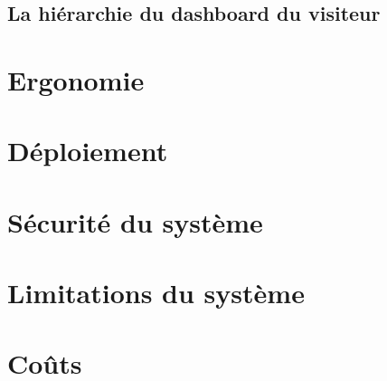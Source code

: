         \subsection{La hiérarchie du dashboard du visiteur}


        \section{Ergonomie}
        \lipsum[1]
        \section{Déploiement}
        \lipsum[1]
        \section{Sécurité du système}
        \lipsum[1]
        \section{Limitations du système}
        \lipsum[1]
        \section{Coûts}
        \lipsum[1]
    
